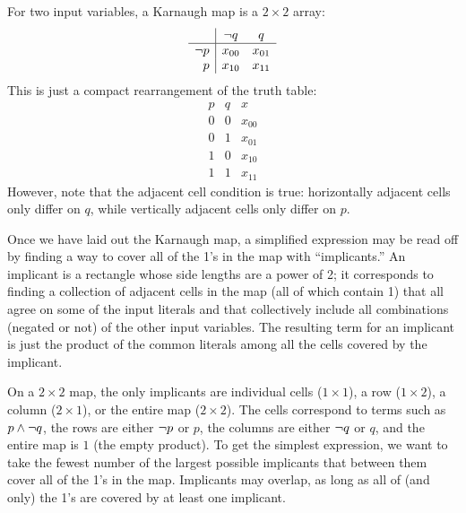 For two input variables, a Karnaugh map is a $2\times 2$ array:
\[ \begin{array}{r|cc}
& \lnot{q} & q\\ \hline
\lnot{p} & x_{00} & x_{01}\\
p & x_{10} & x_{11}
\end{array} \]
This is just a compact rearrangement of the truth table:
\[ \begin{array}{cc|c}
p & q & x\\ \hline
0 & 0 & x_{00}\\
0 & 1 & x_{01}\\
1 & 0 & x_{10}\\
1 & 1 & x_{11}
\end{array} \]
However, note that the adjacent cell condition is true: horizontally adjacent cells only differ on $q$, while vertically adjacent cells only differ on $p$.

Once we have laid out the Karnaugh map, a simplified expression may be read off by finding a way to cover all of the 1's in the map with ``implicants.'' An implicant is a rectangle whose side lengths are a power of 2; it corresponds to finding a collection of adjacent cells in the map (all of which contain 1) that all agree on some of the input literals and that collectively include all combinations (negated or not) of the other input variables. The resulting term for an implicant is just the product of the common literals among all the cells covered by the implicant.

On a $2\times 2$ map, the only implicants are individual cells ($1\times 1$), a row ($1\times 2$), a column ($2\times 1$), or the entire map ($2\times 2$). The cells correspond to terms such as $p\wedge\lnot{q}$, the rows are either $\lnot{p}$ or $p$, the columns are either $\lnot{q}$ or $q$, and the entire map is $1$ (the empty product). To get the simplest expression, we want to take the fewest number of the largest possible implicants that between them cover all of the 1's in the map. Implicants may overlap, as long as all of (and only) the 1's are covered by at least one implicant.

